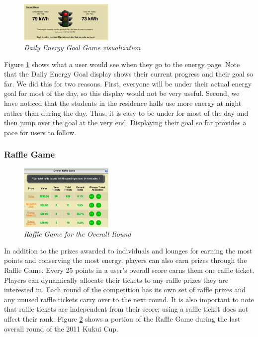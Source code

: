 \documentclass{acm_proc_article-sp}
\begin{document}
\begin{figure}[t!]
  \center
  \includegraphics[width=0.4\textwidth]{daily-energy-goal-game.eps}
  \caption{\em \small Daily Energy Goal Game visualization}
  \label{fig:DailyEnergyGoal}
\end{figure}

Figure \ref{fig:DailyEnergyGoal} shows what a user would see when they go to the energy page. Note that the Daily Energy Goal display shows their current progress and their goal so far. We did this for two reasons. First, everyone will be under their actual energy goal for most of the day, so this display would not be very useful. Second, we have noticed that the students in the residence halls use more energy at night rather than during the day. Thus, it is easy to be under for most of the day and then jump over the goal at the very end. Displaying their goal so far provides a pace for users to follow. 

\subsubsection{Raffle Game}

\begin{figure}[t!]
  \center
  \includegraphics[width=0.4\textwidth]{raffle-small.eps}
  \caption{\em \small Raffle Game for the Overall Round}
  \label{fig:RaffleGame}
\end{figure}

In addition to the prizes awarded to individuals and lounges for earning the most points and conserving the most energy, players can also earn prizes through the Raffle Game. Every 25 points in a user's overall score earns them one raffle ticket. Players can dynamically allocate their tickets to any raffle prizes they are interested in. Each round of the competition has its own set of raffle prizes and any unused raffle tickets carry over to the next round. It is also important to note that raffle tickets are independent from their score; using a raffle ticket does not affect their rank. Figure \ref{fig:RaffleGame} shows a portion of the Raffle Game during the last overall round of the 2011 Kukui Cup.
\end{document}
